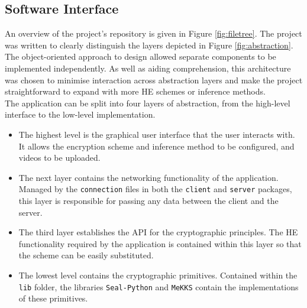 \subsection{Software Interface}
\setlength{\leftskip}{0.5cm}
\indent \indent
An overview of the project's repository is given in Figure \ref{fig:filetree}. The project was written to clearly distinguish the layers depicted in Figure \ref{fig:abstraction}. The object-oriented approach to design allowed separate components to be implemented independently. As well as aiding comprehension, this architecture was chosen to minimise interaction across abstraction layers and make the project straightforward to expand with more HE schemes or inference methods.
\smallskip \\ \indent
The application can be split into four layers of abstraction, from the high-level interface to the low-level implementation.
\begin{itemize}
    \item The highest level is the graphical user interface that the user interacts with. It allows the encryption scheme and inference method to be configured, and videos to be uploaded.
    \item The next layer contains the networking functionality of the application. Managed by the \texttt{connection} files in both the \texttt{client} and \texttt{server} packages, this layer is responsible for passing any data between the client and the server.
    \item The third layer establishes the API for the cryptographic principles. The HE functionality required by the application is contained within this layer so that the scheme can be easily substituted.
    \item The lowest level contains the cryptographic primitives. Contained within the \texttt{lib} folder, the libraries \texttt{Seal-Python} and \texttt{MeKKS} contain the implementations of these primitives.
\end{itemize}

